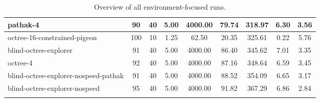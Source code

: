 \begin{sidewaystable}
\begin{longtable}{|l|c|c|c|c|c|c|c|c|}
        pathak-4 & {\cellcolor[HTML]{95C9BE}} \color[HTML]{000000} 90 & 40 & 5.00 & {\cellcolor[HTML]{55AA99}} \color[HTML]{F1F1F1} 4000.00 & 79.74 & {\cellcolor[HTML]{6EB6A7}} \color[HTML]{F1F1F1} 318.97 & 6.30 & 3.56 \\ \hline
        octree-16-constrained-pigeon & {\cellcolor[HTML]{55AA99}} \color[HTML]{F1F1F1} 100 & 10 & 1.25 & {\cellcolor[HTML]{EBF2F0}} \color[HTML]{000000} 62.50 & 20.35 & {\cellcolor[HTML]{6AB4A5}} \color[HTML]{F1F1F1} 325.61 & 0.22 & 5.76 \\ \hline
        blind-octree-explorer & {\cellcolor[HTML]{8FC6BB}} \color[HTML]{000000} 91 & 40 & 5.00 & {\cellcolor[HTML]{55AA99}} \color[HTML]{F1F1F1} 4000.00 & 86.40 & {\cellcolor[HTML]{60AFA0}} \color[HTML]{F1F1F1} 345.62 & 7.01 & 3.35 \\ \hline
        octree-4 & {\cellcolor[HTML]{88C3B7}} \color[HTML]{000000} 92 & 40 & 5.00 & {\cellcolor[HTML]{55AA99}} \color[HTML]{F1F1F1} 4000.00 & 87.16 & {\cellcolor[HTML]{5EAF9E}} \color[HTML]{F1F1F1} 348.64 & 6.59 & 3.45 \\ \hline
        blind-octree-explorer-nospeed-pathak & {\cellcolor[HTML]{8FC6BB}} \color[HTML]{000000} 91 & 40 & 5.00 & {\cellcolor[HTML]{55AA99}} \color[HTML]{F1F1F1} 4000.00 & 88.52 & {\cellcolor[HTML]{5BAD9D}} \color[HTML]{F1F1F1} 354.09 & 6.65 & 3.17 \\ \hline
        blind-octree-explorer-nospeed & {\cellcolor[HTML]{75B9AB}} \color[HTML]{000000} 95 & 40 & 5.00 & {\cellcolor[HTML]{55AA99}} \color[HTML]{F1F1F1} 4000.00 & 91.82 & {\cellcolor[HTML]{55AA99}} \color[HTML]{F1F1F1} 367.29 & 6.86 & 2.84 \\ \hline

        
        \caption{Overview of all environment-focused runs. \label{tab:RQ1-results-octreeFocusedRuns}}
    \end{longtable}

\end{sidewaystable}



    

